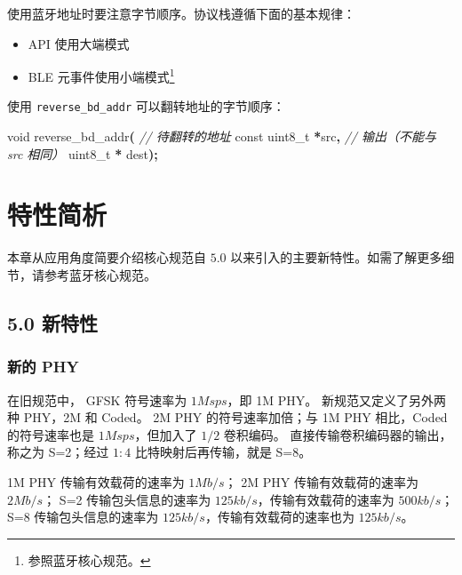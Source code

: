 \documentclass[
  12pt,
]{book}
\newenvironment{Shaded}{\begin{snugshade}}{\end{snugshade}}
\newcommand{\CommentTok}[1]{\textcolor[rgb]{0.56,0.35,0.01}{\textit{#1}}}
\newcommand{\DataTypeTok}[1]{\textcolor[rgb]{0.13,0.29,0.53}{#1}}
\newcommand{\NormalTok}[1]{#1}
\newcommand{\OperatorTok}[1]{\textcolor[rgb]{0.81,0.36,0.00}{\textbf{#1}}}
\providecommand{\tightlist}{%
  \setlength{\itemsep}{0pt}\setlength{\parskip}{0pt}}
\begin{document}
使用蓝牙地址时要注意字节顺序。协议栈遵循下面的基本规律：

\begin{itemize}
\tightlist
\item
  API 使用大端模式
\item
  BLE 元事件使用小端模式\footnote{参照蓝牙核心规范。}
\end{itemize}

使用 \texttt{reverse\_bd\_addr} 可以翻转地址的字节顺序：

\begin{Shaded}
\begin{Highlighting}[]
\DataTypeTok{void}\NormalTok{ reverse\_bd\_addr}\OperatorTok{(}
    \CommentTok{// 待翻转的地址}
    \DataTypeTok{const} \DataTypeTok{uint8\_t} \OperatorTok{*}\NormalTok{src}\OperatorTok{,}
    \CommentTok{// 输出（不能与 src 相同）}
    \DataTypeTok{uint8\_t} \OperatorTok{*}\NormalTok{ dest}\OperatorTok{);}
\end{Highlighting}
\end{Shaded}

\hypertarget{ch-features}{%
\chapter{特性简析}\label{ch-features}}

本章从应用角度简要介绍核心规范自 \(5.0\) 以来引入的主要新特性。如需了解更多细节，请参考蓝牙核心规范。

\hypertarget{ux65b0ux7279ux6027}{%
\section{5.0 新特性}\label{ux65b0ux7279ux6027}}

\hypertarget{ux65b0ux7684-phy}{%
\subsection{新的 PHY}\label{ux65b0ux7684-phy}}

在旧规范中， GFSK 符号速率为 \(1 M sps\)，即 1M PHY。
新规范又定义了另外两种 PHY，2M 和 Coded。
2M PHY 的符号速率加倍；与 1M PHY 相比，Coded 的符号速率也是 \(1 M sps\)，但加入了 \(1/2\) 卷积编码。
直接传输卷积编码器的输出，称之为 S=2；经过 \(1:4\) 比特映射后再传输，就是 S=8。

1M PHY 传输有效载荷的速率为 \(1Mb/s\)；
2M PHY 传输有效载荷的速率为 \(2Mb/s\)；
S=2 传输包头信息的速率为 \(125kb/s\)，传输有效载荷的速率为 \(500kb/s\)；
S=8 传输包头信息的速率为 \(125kb/s\)，传输有效载荷的速率也为 \(125kb/s\)。
\end{document}
